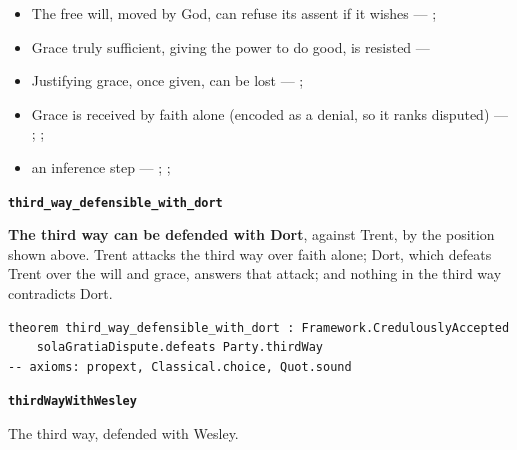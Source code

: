 \documentclass[11pt]{article}
\begin{document}
\begin{itemize}
\begin{itemize}
\item The free will, moved by God, can refuse its assent if it wishes --- \cite[Trent, Session VI (1547), canon 4]{tanner-decrees-1990}; \cite[45]{waterworth-trent-1848}
\item Grace truly sufficient, giving the power to do good, is resisted --- \cite[ch. VI]{garrigou-lagrange-grace-1952}
\item Justifying grace, once given, can be lost --- \cite[II-II q.24 a.11]{aquinas-summa-1920}; \cite[Trent, Session VI (1547), canon 23]{tanner-decrees-1990}
\item Grace is received by faith alone (encoded as a denial, so it ranks disputed) --- \cite[II-II q.4 a.3]{aquinas-summa-1920}; \cite[I-II q.113 a.4 ad 1]{aquinas-summa-1920}; \cite[Trent, Session VI (1547), canon 9]{tanner-decrees-1990}
\item an inference step --- \cite{pohle-molinism-1911}; \cite[I-II q.112 a.3]{aquinas-summa-1920}; \cite[ch. VII]{garrigou-lagrange-grace-1952}
\end{itemize}
\end{itemize}
\par\medskip\noindent\textbf{\texttt{third\_\allowbreak{}way\_\allowbreak{}defensible\_\allowbreak{}with\_\allowbreak{}dort}}\par\nobreak\noindent
\textbf{The third way can be defended with Dort}, against Trent, by the position shown above. Trent attacks the third way over faith alone; Dort, which defeats Trent over the will and grace, answers that attack; and nothing in the third way contradicts Dort.

{\small\begin{verbatim}
theorem third_way_defensible_with_dort : Framework.CredulouslyAccepted
    solaGratiaDispute.defeats Party.thirdWay
-- axioms: propext, Classical.choice, Quot.sound
\end{verbatim}}
\par\medskip\noindent\textbf{\texttt{third\allowbreak{}Way\allowbreak{}With\allowbreak{}Wesley}}\par\nobreak\noindent
The third way, defended with Wesley.
\end{document}
